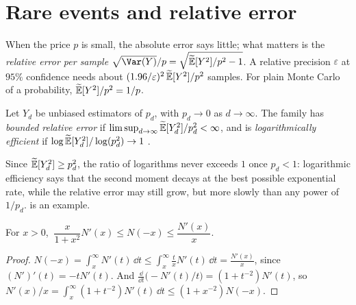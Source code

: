 \section{Rare events and relative error}\label{sec:is-rare}

When the price $p$ is small, the absolute error says little; what matters is the
\emph{relative error per sample} $\sqrt{\Var(Y)}/p=\sqrt{\Et[Y^2]/p^2-1}$. A relative
precision $\varepsilon$ at $95\%$ confidence needs about $(1.96/\varepsilon)^2\,\widetilde{\mathbb E}[Y^2]/p^2$
samples. For plain Monte Carlo of a probability, $\widetilde{\mathbb E}[Y^2]/p^2=1/p$.

\begin{definition}\label{def:is-efficiency}
Let $Y_d$ be unbiased estimators of $p_d$, with $p_d\to0$ as $d\to\infty$. The family has
\emph{bounded relative error} if $\limsup_{d\to\infty}\widetilde{\mathbb E}[Y_d^2]/p_d^2<\infty$, and is
\emph{logarithmically efficient} if $\log\widetilde{\mathbb E}[Y_d^2]/\log(p_d^2)\to1$
\citep[Section~VI.1]{asmussen-glynn}.
\end{definition}

Since $\widetilde{\mathbb E}[Y_d^2]\ge p_d^2$, the ratio of logarithms never exceeds $1$ once $p_d<1$:
logarithmic efficiency says that the second moment decays at the best possible exponential
rate, while the relative error may still grow, but more slowly than any power of $1/p_d$.
 is an example.

\begin{lemma}\label{lem:is-mills}
For $x>0$, $\ \dfrac{x}{1+x^2}N'(x)\le N(-x)\le\dfrac{N'(x)}{x}$.
\end{lemma}

\begin{proof}
$N(-x)=\int_x^\infty N'(t)\,\dd t\le\int_x^\infty\frac tx N'(t)\,\dd t=\frac{N'(x)}x$, since
$(N')'(t)=-tN'(t)$. And $\frac{\dd}{\dd t}\big(-N'(t)/t\big)=(1+t^{-2})N'(t)$, so
$N'(x)/x=\int_x^\infty(1+t^{-2})N'(t)\,\dd t\le(1+x^{-2})N(-x)$.
\end{proof}

